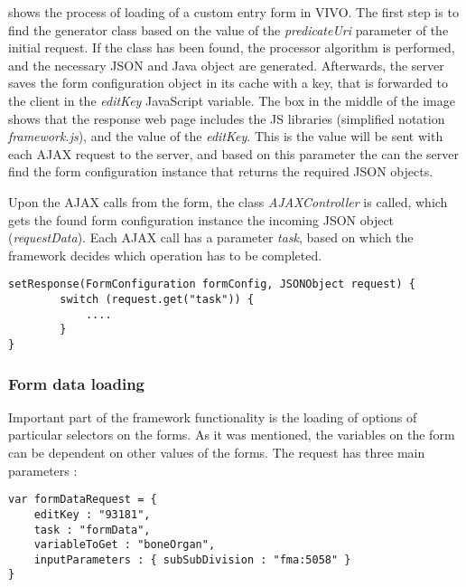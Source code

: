 

 shows the process of loading of a custom entry form in VIVO. The first step is to find the generator class based on the value of the \textit{predicateUri} parameter of the initial request. If the class has been found, the processor algorithm is performed, and the necessary JSON and Java object are generated. Afterwards, the server saves the form configuration object in its cache with a key, that is forwarded to the client in the \textit{editKey} JavaScript variable. The box in the middle of the image shows that the response web page includes the JS libraries (simplified notation \textit{framework.js}), and the value of the \textit{editKey}. This is the value will be sent with each AJAX request to the server, and based on this parameter the can the server find the form configuration instance that returns the required JSON objects.


Upon the AJAX calls from the form, the class \textit{AJAXController} is called, which gets the found form configuration instance the incoming JSON object (\textit{requestData}). Each AJAX call has a parameter \textit{task}, based on which the framework decides which operation has to be completed.

\begin{lstlisting}[basicstyle=\footnotesize, frame=single, caption={AJAX request server routine}, label=serveRequest, captionpos=b, belowskip=1em, aboveskip=2em]
setResponse(FormConfiguration formConfig, JSONObject request) {
		switch (request.get("task")) {
			....
		}
}
\end{lstlisting}

\subsubsection{Form data loading}

Important part of the framework functionality is the loading of options of particular selectors on the forms. As it was mentioned, the variables on the form can be dependent on other values of the forms. The request has three main parameters :

\begin{lstlisting}[basicstyle=\footnotesize, frame=single, caption={Example request JSON for form data}, label=serveRequest, captionpos=b, belowskip=1em, aboveskip=2em]
var formDataRequest = {
	editKey : "93181",
	task : "formData",
	variableToGet : "boneOrgan",
	inputParameters : { subSubDivision : "fma:5058" }
}
\end{lstlisting}

